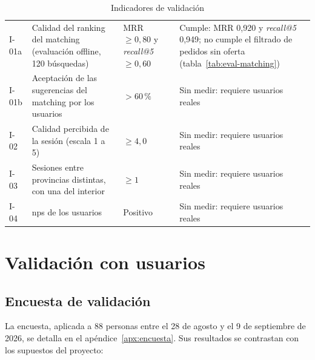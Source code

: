 \begin{table}[H]
    \centering
    \caption{Indicadores de validación}
    \label{tab:indicadores-validacion}
    \small
    \begin{tabularx}{\textwidth}{l L L L}
        \toprule
         &  &  &  \\
        \midrule
        I-01a & Calidad del ranking del \gls{matching} (evaluación offline, 120 búsquedas) & MRR $\geq 0{,}80$ y \emph{recall@5} $\geq 0{,}60$ & Cumple: MRR 0,920 y \emph{recall@5} 0,949; no cumple el filtrado de pedidos sin oferta (tabla~\ref{tab:eval-matching}) \\
        I-01b & Aceptación de las sugerencias del \gls{matching} por los usuarios & $> 60\,\%$ & Sin medir: requiere usuarios reales \\
        I-02  & Calidad percibida de la sesión (escala 1 a 5) & $\geq 4{,}0$ & Sin medir: requiere usuarios reales \\
        I-03  & Sesiones entre provincias distintas, con una del interior & $\geq 1$ & Sin medir: requiere usuarios reales \\
        I-04  & \gls{nps} de los usuarios & Positivo & Sin medir: requiere usuarios reales \\
        \bottomrule
    \end{tabularx}
\end{table}

\section{Validación con usuarios}

\subsection{Encuesta de validación}

La encuesta, aplicada a 88 personas entre el 28 de agosto y el 9 de
septiembre de 2026, se detalla en el apéndice~\ref{apx:encuesta}. Sus
resultados se contrastan con los supuestos del proyecto:

